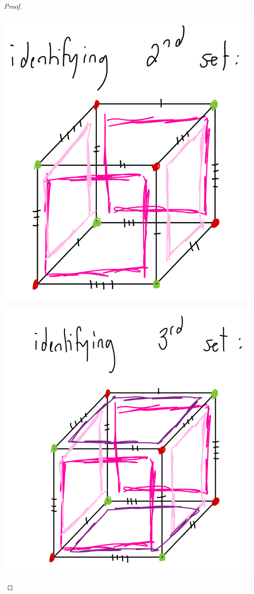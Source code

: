\documentclass[12pt]{article}
\begin{document}
\begin{proof}
  \par \begin{center} \includegraphics[scale=.2]{2-2.png} \end{center} 
  \par \begin{center} \includegraphics[scale=.2]{2-3.png} \end{center} 

\end{proof}
\end{document}
